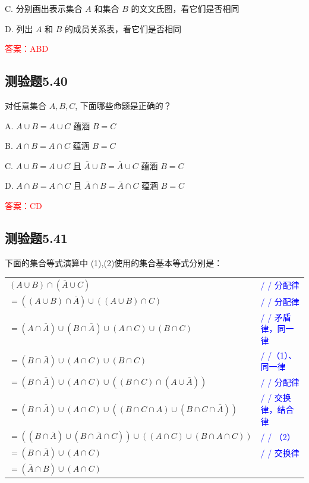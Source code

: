 \documentclass[UTF8, heading=true]{ctexart}
\begin{document}
C. 分别画出表示集合 $A$ 和集合 $B$ 的文文氏图，看它们是否相同

D. 列出 $A$ 和 $B$ 的成员关系表，看它们是否相同

\textcolor{red}{答案：ABD}

\subsection{测验题5.40}
对任意集合 $A, B, C$, 下面哪些命题是正确的？

A. $ A \cup B=A \cup C$ 蕴涵 $B=C$

B. $A \cap B=A \cap C$ 蕴涵 $B=C$

C. $A \cup B=A \cup C$ 且 $\bar{A} \cup B=\bar{A} \cup C$ 蕴涵 $B=C$

D. $A \cap B=A \cap C$ 且 $\bar{A} \cap B=\bar{A} \cap C$ 蕴涵 $B=C$

\textcolor{red}{答案：CD}


\subsection{测验题5.41}
下面的集合等式演算中 (1),(2)使用的集合基本等式分别是：


\begin{table}[H]
  \centering
  \renewcommand{\arraystretch}{1.5}
  \begin{tabular}{ll}
    $(A \cup B) \cap (\bar{A} \cup C)$ & \textcolor{blue}{/ / 分配律} \\
    $=((A \cup B) \cap \bar{A}) \cup ((A \cup B) \cap C)$ & \textcolor{blue}{/ / 分配律} \\
    $=(A \cap \bar{A}) \cup (B \cap \bar{A}) \cup (A \cap C) \cup (B \cap C)$ & \textcolor{blue}{/ / 矛盾律，同一律} \\
    $=(B \cap \bar{A}) \cup (A \cap C) \cup (B \cap C)$ & \textcolor{blue}{/ /（1）、 同一律} \\
    $=(B \cap \bar{A}) \cup (A \cap C) \cup ((B \cap C) \cap (A \cup \bar{A}))$ & \textcolor{blue}{/ / 分配律} \\
    $=(B \cap \bar{A}) \cup (A \cap C) \cup ((B \cap C \cap A) \cup (B \cap C \cap \bar{A}))$ & \textcolor{blue}{/ / 交换律，结合律} \\
    $=((B \cap \bar{A}) \cup (B \cap \bar{A} \cap C)) \cup ((A \cap C) \cup (B \cap A \cap C))$ & \textcolor{blue}{/ / （2）} \\
    $=(B \cap \bar{A}) \cup (A \cap C)$ & \textcolor{blue}{/ / 交换律} \\
    $=(\bar{A} \cap B) \cup (A \cap C)$ & \\
  \end{tabular}
\end{table}
\end{document}
